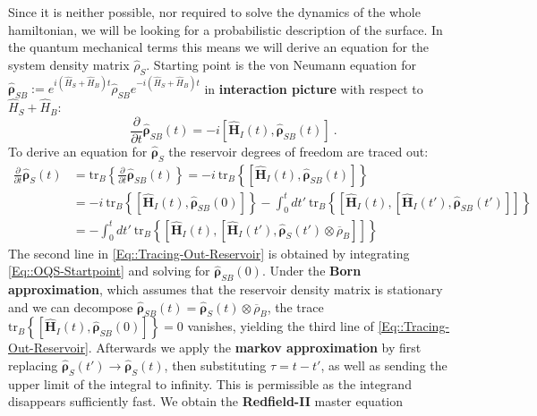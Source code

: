 	Since it is neither possible, nor required to solve the dynamics of the whole hamiltonian, we will be looking for a probabilistic description of the surface. In the quantum mechanical terms this means we will derive an equation for the system  density matrix $\hat{\rho}_{S}$. Starting point is the von Neumann equation for $\boldsymbol{\hat{\rho}}_{SB} :=	e^{i \left(\hat{H}_S + \hat{H}_B\right)t} \hat{\rho}_{SB} e^{-i \left(\hat{H}_S + \hat{H}_B\right)t}$ in \textbf{interaction picture} with respect to $\hat{H}_S + \hat{H}_B$:
	\begin{equation} \label{Eq::OQS-Startpoint}
		\frac{\partial}{\partial t}\boldsymbol{\hat{\rho}}_{SB}(t) =	- i \left[\boldsymbol{\hat{H}}_I(t), \boldsymbol{\hat{\rho}}_{SB}(t) \right] ~.
	\end{equation}
	To derive an equation for $\boldsymbol{\hat{\rho}}_S$ the reservoir degrees of freedom are traced out:
	\begin{equation} \label{Eq::Tracing-Out-Reservoir}
		\begin{split}
			\frac{\partial}{\partial t} \boldsymbol{\hat{\rho}}_S(t) &=	\text{tr}_B \left \lbrace \frac{\partial}{\partial t} \boldsymbol{\hat{\rho}}_{SB}(t) \right \rbrace =	-i~\text{tr}_B \left\lbrace \left[\boldsymbol{\hat{H}}_I(t), \boldsymbol{\hat{\rho}}_{SB}(t)\right] \right\rbrace  \\
			&=	-i~\text{tr}_B \left\lbrace \left[\boldsymbol{\hat{H}}_I(t), \boldsymbol{\hat{\rho}}_{SB}(0)\right] \right \rbrace - \int_{0}^{t} dt'~ \text{tr}_B \left\{  \left[\boldsymbol{\hat{H}}_I(t), \left[\boldsymbol{\hat{H}}_I(t'), \boldsymbol{\hat{\rho}}_{SB}(t') \right]\right]  \right\} \\
			&=- \int_{0}^{t} dt'~ \text{tr}_B \left\{  \left[\boldsymbol{\hat{H}}_I(t), \left[\boldsymbol{\hat{H}}_I(t'), \boldsymbol{\hat{\rho}}_S(t') \otimes \overline{\rho}_B \right]\right]  \right\}
		\end{split}
	\end{equation}
	The second line in \autoref{Eq::Tracing-Out-Reservoir} is obtained by integrating \autoref{Eq::OQS-Startpoint} and solving for $\boldsymbol{\hat{\rho}}_{SB}(0)$. Under the \textbf{Born approximation}, which assumes that the reservoir density matrix is stationary and we can decompose $\boldsymbol{\hat{\rho}}_{SB}(t) = \boldsymbol{\hat{\rho}}_S(t) \otimes \overline{\rho}_B$, the trace $\text{tr}_B \left\lbrace \left[\boldsymbol{\hat{H}}_I(t), \boldsymbol{\hat{\rho}}_{SB}(0)\right] \right \rbrace =	0$ vanishes, yielding the third line of \autoref{Eq::Tracing-Out-Reservoir}. Afterwards we apply the \textbf{markov approximation} \cite{landi2022nonequilibrium} by first replacing $\boldsymbol{\hat{\rho}}_S(t') \rightarrow \boldsymbol{\hat{\rho}}_S(t)$, then substituting $\tau =t - t'$, as well as sending the upper limit of the integral to infinity. This is permissible as the integrand disappears sufficiently fast. We obtain the \textbf{Redfield-II} master equation
